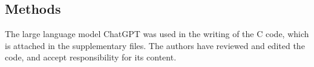 \documentclass[10pt,reqno]{amsart}
\numberwithin{equation}{section}
\theoremstyle{definition}
\begin{document}
{{    %

\subsection*{Methods} The large language model ChatGPT was used in the writing of the C code, which is attached in the supplementary files. The authors have reviewed and edited the code, and accept responsibility for its content. 


}}
\end{document}
